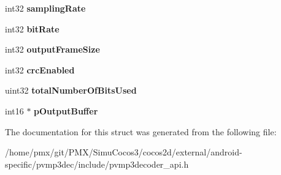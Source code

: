 \begin{DoxyCompactItemize}
\mbox{\label{structtPVMP3DecoderExternal_a5e34ba6ef099b875cfe861bd3558eee6}} 
int32 {\bfseries sampling\+Rate}
\item 
\mbox{\label{structtPVMP3DecoderExternal_a90dc0e5a1fc731ac8e54901763c17d15}} 
int32 {\bfseries bit\+Rate}
\item 
\mbox{\label{structtPVMP3DecoderExternal_a0f788e188c3cb571e5c6df667b2a6ee2}} 
int32 {\bfseries output\+Frame\+Size}
\item 
\mbox{\label{structtPVMP3DecoderExternal_a0870c572bdaf50d1c15b9d4ea1c6928c}} 
int32 {\bfseries crc\+Enabled}
\item 
\mbox{\label{structtPVMP3DecoderExternal_a4d2fb0b7e4bef11a2d85a0d7601b0be5}} 
uint32 {\bfseries total\+Number\+Of\+Bits\+Used}
\item 
\mbox{\label{structtPVMP3DecoderExternal_a9ba103e3ae014c6e6c4f17750fbe62dd}} 
int16 $\ast$ {\bfseries p\+Output\+Buffer}
\end{DoxyCompactItemize}


The documentation for this struct was generated from the following file\+:\begin{DoxyCompactItemize}
\item 
/home/pmx/git/\+P\+M\+X/\+Simu\+Cocos3/cocos2d/external/android-\/specific/pvmp3dec/include/pvmp3decoder\+\_\+api.\+h\end{DoxyCompactItemize}

